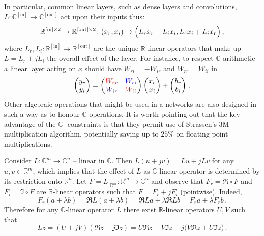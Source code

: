 \documentclass[a4paper,10pt]{article}
\newcommand{\real}{\mathbb{R}}
\newcommand{\cplx}{\mathbb{C}}
\begin{document}
In particular, common linear layers, such as dense layers and convolutions,
$
  L \colon \cplx^{\mathrm{[in]}}
    \to \cplx^{\mathrm{[out]}}
$ act upon their inputs thus:
$$
\real^{\mathrm{[in]} \times 2}
  \to \real^{\mathrm{[out]} \times 2}
  \colon (x_r, x_i)
    \mapsto \Bigl(
      L_r x_r - L_i x_i,
      L_r x_i + L_i x_r
    \Bigr)
  \,, $$
where $
  L_r, L_i
    \colon \real^{\mathrm{[in]}}
      \to \real^{\mathrm{[out]}}
$ are the unique $\real$-linear operators that make up $L = L_r + j L_i$ the overall
effect of the layer. For instance, to respect $\cplx$-arithmetic a linear layer acting
on $x$ should have $W_{ri} = - W_{ir}$ and $W_{rr} = W_{ii}$ in
$$
  \begin{pmatrix}
    y_r \\ y_i
  \end{pmatrix}
    = \begin{pmatrix}
      {\color{red} W_{rr}} & {\color{blue} W_{ri}} \\ 
      {\color{blue} W_{ir}} & {\color{red} W_{ii}}
    \end{pmatrix}
    \begin{pmatrix}
      x_r \\ x_i
    \end{pmatrix}
    + \begin{pmatrix}
      b_r \\ b_i
    \end{pmatrix}
  \,. $$
Other algebraic operations that might be used in a networks are also designed in such a way as
to honour $\cplx$-operations. It is worth pointing out that the key advantage of the $\cplx$-%
constraints is that they permit use of Strassen's $3$M multiplication algorithm, potentially
saving up to $25\%$ on floating point multiplications.

Consider $L\colon \cplx^m \to \cplx^n$ -- linear in $\cplx$. Then $
  L(u + jv) = L u + j L v
$ for any $u, v \in \real^m$, which implies that the effect of $L$ as $\cplx$-linear
operator is determined by its restriction onto $\real^n$. Let $
  F = L\vert_{\real^m}
  \colon \real^m \to \cplx^n
$ and observe that $F_r = \Re \circ F$ and $F_i = \Im \circ F$ are $\real$-linear operators
such that $F = F_r + j F_i$ (pointwise). Indeed,
$$
  F_r(a + \lambda b)
  = \Re L(a + \lambda b)
  = \Re L a + \lambda \Re L b
  = F_r a + \lambda F_r b
  \,. $$
Therefore for any $\cplx$-linear operator $L$ there exist $\real$-linear operators $U, V$
such that
$$
L z 
  = (U + j V) (\Re z + j \Im z)
  = U \Re z - V \Im z + j \bigl( V \Re z + U \Im z \bigr)
  \,. $$
\end{document}
